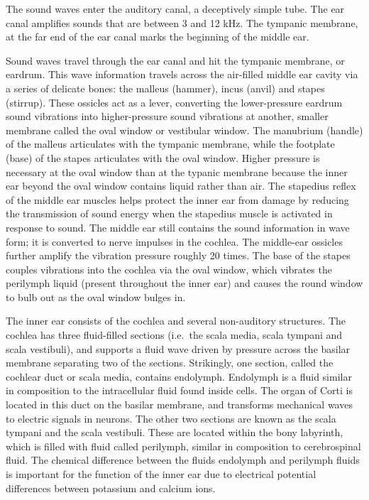 The sound waves enter the auditory canal, a deceptively simple tube. The ear canal amplifies sounds that are between 3 and 12 kHz. The tympanic membrane, at the far end of the ear canal marks the beginning of the middle ear.

Sound waves travel through the ear canal and hit the tympanic membrane, or eardrum. This wave information travels across the air-filled middle ear cavity via a series of delicate bones: the malleus (hammer), incus (anvil) and stapes (stirrup). These ossicles act as a lever, converting the lower-pressure eardrum sound vibrations into higher-pressure sound vibrations at another, smaller membrane called the oval window or vestibular window. The manubrium (handle) of the malleus articulates with the tympanic membrane, while the footplate (base) of the stapes articulates with the oval window. Higher pressure is necessary at the oval window than at the typanic membrane because the inner ear beyond the oval window contains liquid rather than air. The stapedius reflex of the middle ear muscles helps protect the inner ear from damage by reducing the transmission of sound energy when the stapedius muscle is activated in response to sound. The middle ear still contains the sound information in wave form; it is converted to nerve impulses in the cochlea.
The middle-ear ossicles further amplify the vibration pressure roughly 20 times. The base of the stapes couples vibrations into the cochlea via the oval window, which vibrates the perilymph liquid (present throughout the inner ear) and causes the round window to bulb out as the oval window bulges in.

The inner ear consists of the cochlea and several non-auditory structures. The cochlea has three fluid-filled sections (i.e.~the scala media, scala tympani and scala vestibuli), and supports a fluid wave driven by pressure across the basilar membrane separating two of the sections. Strikingly, one section, called the cochlear duct or scala media, contains endolymph. Endolymph is a fluid similar in composition to the intracellular fluid found inside cells. The organ of Corti is located in this duct on the basilar membrane, and transforms mechanical waves to electric signals in neurons. The other two sections are known as the scala tympani and the scala vestibuli. These are located within the bony labyrinth, which is filled with fluid called perilymph, similar in composition to cerebrospinal fluid. The chemical difference between the fluids endolymph and perilymph fluids is important for the function of the inner ear due to electrical potential differences between potassium and calcium ions.

